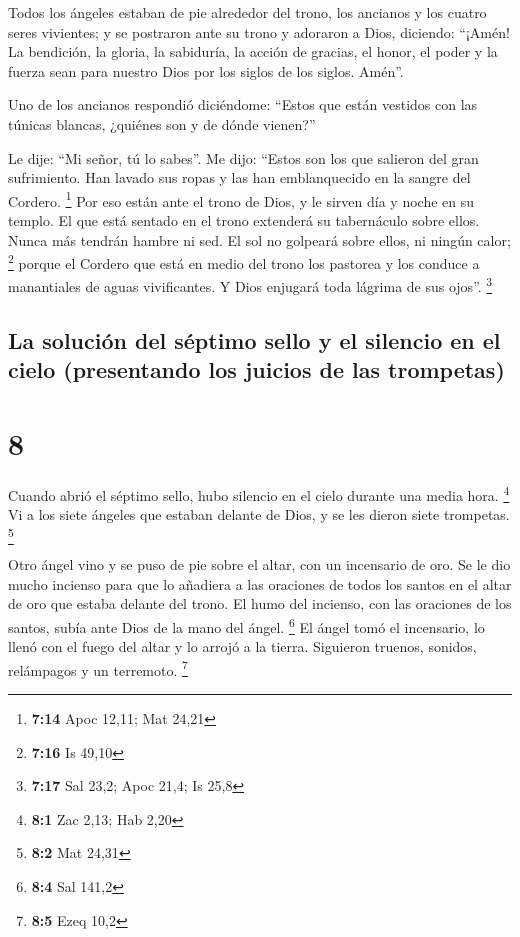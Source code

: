  Todos los ángeles estaban de pie alrededor del trono,
los ancianos y los cuatro seres vivientes; y se postraron ante su trono
y adoraron a Dios,  diciendo: ``¡Amén! La bendición, la
gloria, la sabiduría, la acción de gracias, el honor, el poder y la
fuerza sean para nuestro Dios por los siglos de los siglos. Amén''.

 Uno de los ancianos respondió diciéndome: ``Estos que
están vestidos con las túnicas blancas, ¿quiénes son y de dónde
vienen?''

 Le dije: ``Mi señor, tú lo sabes''. Me dijo: ``Estos son
los que salieron del gran sufrimiento. Han lavado sus ropas y las han
emblanquecido en la sangre del Cordero. \footnote{\textbf{7:14} Apoc
  12,11; Mat 24,21}  Por eso están ante el trono de Dios,
y le sirven día y noche en su templo. El que está sentado en el trono
extenderá su tabernáculo sobre ellos.  Nunca más tendrán
hambre ni sed. El sol no golpeará sobre ellos, ni ningún calor;
\footnote{\textbf{7:16} Is 49,10}  porque el Cordero que
está en medio del trono los pastorea y los conduce a manantiales de
aguas vivificantes. Y Dios enjugará toda lágrima de sus ojos''.
\footnote{\textbf{7:17} Sal 23,2; Apoc 21,4; Is 25,8}

\hypertarget{la-soluciuxf3n-del-suxe9ptimo-sello-y-el-silencio-en-el-cielo-presentando-los-juicios-de-las-trompetas}{%
\subsection{La solución del séptimo sello y el silencio en el cielo
(presentando los juicios de las
trompetas)}\label{la-soluciuxf3n-del-suxe9ptimo-sello-y-el-silencio-en-el-cielo-presentando-los-juicios-de-las-trompetas}}

\hypertarget{section-7}{%
\section{8}\label{section-7}}

 Cuando abrió el séptimo sello, hubo silencio en el cielo
durante una media hora. \footnote{\textbf{8:1} Zac 2,13; Hab 2,20}
 Vi a los siete ángeles que estaban delante de Dios, y se
les dieron siete trompetas. \footnote{\textbf{8:2} Mat 24,31}

 Otro ángel vino y se puso de pie sobre el altar, con un
incensario de oro. Se le dio mucho incienso para que lo añadiera a las
oraciones de todos los santos en el altar de oro que estaba delante del
trono.  El humo del incienso, con las oraciones de los
santos, subía ante Dios de la mano del ángel. \footnote{\textbf{8:4} Sal
  141,2}  El ángel tomó el incensario, lo llenó con el
fuego del altar y lo arrojó a la tierra. Siguieron truenos, sonidos,
relámpagos y un terremoto. \footnote{\textbf{8:5} Ezeq 10,2}


